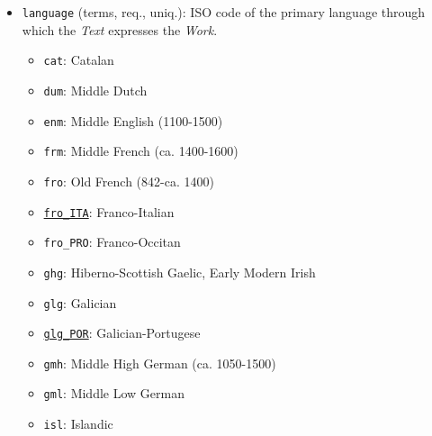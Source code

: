 \begin{itemize}
\begin{itemize}
\begin{itemize}
                    \item \texttt{rijmkronieken}: Rhyming chronicle (i.e. \textit{Brabantsche Yeesten})
                \end{itemize}
            \item Relevant to Middle English, Middle Irish, Middle Welsh traditions
            \begin{itemize}
                \item \texttt{romance}
            \end{itemize}
            \item Relevant to Middle High German tradition
            \begin{itemize}
                \item \texttt{Roman}
                \item \texttt{Spielmannsdichtung}\footcite[][]{Spielmannsdichtung}
            \end{itemize}
        \end{itemize}
    \item \texttt{language} (terms, req., uniq.): ISO code of the primary language through which the \textit{Text} expresses the \textit{Work}.
    \begin{multicols}{2}
        \begin{itemize}
            \item \texttt{cat}: Catalan
            \item \texttt{dum}: Middle Dutch
            \item \texttt{enm}: Middle English (1100-1500)
            \item \texttt{frm}: Middle French (ca. 1400-1600)
            \item \texttt{fro}: Old French (842-ca. 1400)
            \item \href{https://www.wikidata.org/wiki/Q54879035}{\texttt{fro\_ITA}}: Franco-Italian
            \item \texttt{fro\_PRO}: Franco-Occitan
            \item \texttt{ghg}: Hiberno-Scottish Gaelic, Early Modern Irish
            \item \texttt{glg}: Galician
            \item \href{https://www.wikidata.org/wiki/Q1072111}{\texttt{glg\_POR}}: Galician-Portugese
            \item \texttt{gmh}: Middle High German (ca. 1050-1500)
            \item \texttt{gml}: Middle Low German
            \item \texttt{isl}: Islandic

\end{itemize}
\end{multicols}
\end{itemize}
